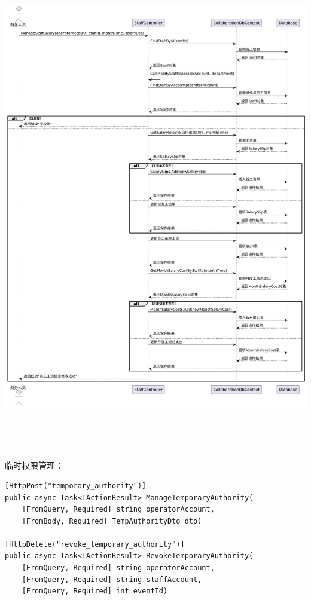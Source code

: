 \documentclass[]{article}
\begin{document}
\includegraphics[width=6.32153in,height=8.45556in]{media/media/image18.png}

临时权限管理：
\begin{verbatim}
[HttpPost("temporary_authority")]
public async Task<IActionResult> ManageTemporaryAuthority(
    [FromQuery, Required] string operatorAccount,
    [FromBody, Required] TempAuthorityDto dto)

[HttpDelete("revoke_temporary_authority")]
public async Task<IActionResult> RevokeTemporaryAuthority(
    [FromQuery, Required] string operatorAccount,
    [FromQuery, Required] string staffAccount,
    [FromQuery, Required] int eventId)
\end{verbatim}
\end{document}
